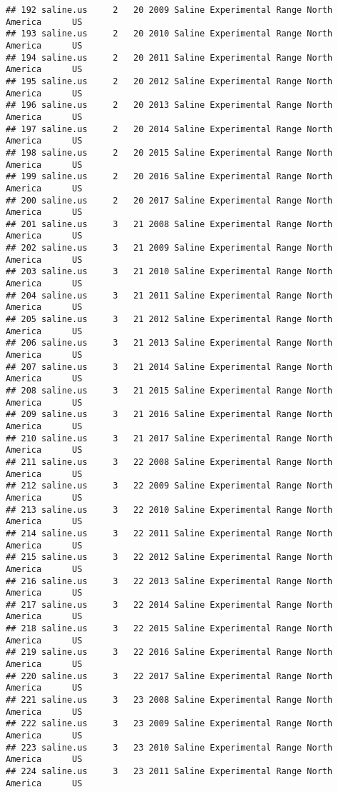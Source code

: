 \documentclass[]{article}
\begin{document}
\begin{verbatim}
## 192 saline.us     2   20 2009 Saline Experimental Range North America      US
## 193 saline.us     2   20 2010 Saline Experimental Range North America      US
## 194 saline.us     2   20 2011 Saline Experimental Range North America      US
## 195 saline.us     2   20 2012 Saline Experimental Range North America      US
## 196 saline.us     2   20 2013 Saline Experimental Range North America      US
## 197 saline.us     2   20 2014 Saline Experimental Range North America      US
## 198 saline.us     2   20 2015 Saline Experimental Range North America      US
## 199 saline.us     2   20 2016 Saline Experimental Range North America      US
## 200 saline.us     2   20 2017 Saline Experimental Range North America      US
## 201 saline.us     3   21 2008 Saline Experimental Range North America      US
## 202 saline.us     3   21 2009 Saline Experimental Range North America      US
## 203 saline.us     3   21 2010 Saline Experimental Range North America      US
## 204 saline.us     3   21 2011 Saline Experimental Range North America      US
## 205 saline.us     3   21 2012 Saline Experimental Range North America      US
## 206 saline.us     3   21 2013 Saline Experimental Range North America      US
## 207 saline.us     3   21 2014 Saline Experimental Range North America      US
## 208 saline.us     3   21 2015 Saline Experimental Range North America      US
## 209 saline.us     3   21 2016 Saline Experimental Range North America      US
## 210 saline.us     3   21 2017 Saline Experimental Range North America      US
## 211 saline.us     3   22 2008 Saline Experimental Range North America      US
## 212 saline.us     3   22 2009 Saline Experimental Range North America      US
## 213 saline.us     3   22 2010 Saline Experimental Range North America      US
## 214 saline.us     3   22 2011 Saline Experimental Range North America      US
## 215 saline.us     3   22 2012 Saline Experimental Range North America      US
## 216 saline.us     3   22 2013 Saline Experimental Range North America      US
## 217 saline.us     3   22 2014 Saline Experimental Range North America      US
## 218 saline.us     3   22 2015 Saline Experimental Range North America      US
## 219 saline.us     3   22 2016 Saline Experimental Range North America      US
## 220 saline.us     3   22 2017 Saline Experimental Range North America      US
## 221 saline.us     3   23 2008 Saline Experimental Range North America      US
## 222 saline.us     3   23 2009 Saline Experimental Range North America      US
## 223 saline.us     3   23 2010 Saline Experimental Range North America      US
## 224 saline.us     3   23 2011 Saline Experimental Range North America      US

\end{verbatim}
\end{document}
